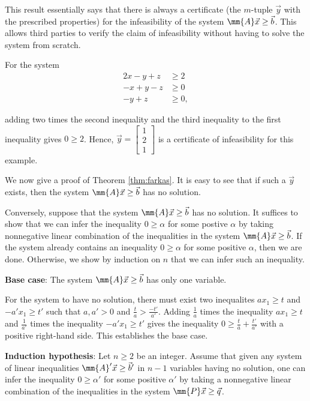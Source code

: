This result essentially says that there is always a certificate (the
\(m\)-tuple \(\vec{y}\) with the prescribed properties) for the
infeasibility of the system \(\mm{A}\vec{x} \geq \vec{b}\). This allows
third parties to verify the claim of infeasibility without having to
solve the system from scratch.

\begin{example}{}{}
\protect\hypertarget{ex:unnamed-chunk-2}{}{\label{ex:unnamed-chunk-2}} For
the system
\begin{align*}
2x - y + z & \geq 2 \\
-x + y - z & \geq 0 \\
   - y + z & \geq 0,
\end{align*}

adding two times the second inequality and the third inequality to the
first inequality gives \(0 \geq 2\). Hence,
\(\vec{y} = \begin{bmatrix} 1\\ 2 \\ 1\end{bmatrix}\) is a certificate
of infeasibility for this example.
\end{example}

We now give a proof of Theorem \ref{thm:farkas}. It is easy to see that
if such a \(\vec{y}\) exists, then the system
\(\mm{A}\vec{x} \geq \vec{b}\) has no solution.

Conversely, suppose that the system \(\mm{A}\vec{x} \geq \vec{b}\) has
no solution. It suffices to show that we can infer the inequality
\(0 \geq \alpha\) for some postive \(\alpha\) by taking nonnegative
linear combination of the inequalities in the system
\(\mm{A}\vec{x} \geq \vec{b}\). If the system already contains an
inequality \(0 \geq \alpha\) for some positive \(\alpha\), then we are
done. Otherwise, we show by induction on \(n\) that we can infer such an
inequality.

\textbf{Base case}: The system \(\mm{A}\vec{x} \geq \vec{b}\) has only
one variable.

For the system to have no solution, there must exist two inequalites
\(ax_1 \geq t\) and \(-a'x_1 \geq t'\) such that \(a, a' \gt 0\) and
\(\frac{t}{a} \gt \frac{-t'}{a'}\). Adding \(\frac{1}{a}\) times the
inequality \(ax_1 \geq t\) and \(\frac{1}{a'}\) times the inequality
\(-a'x_1 \geq t'\) gives the inequality
\(0 \geq \frac{t}{a} + \frac{t'}{a'}\) with a positive right-hand side.
This establishes the base case.

\textbf{Induction hypothesis}: Let \(n \geq 2\) be an integer. Assume
that given any system of linear inequalities
\(\mm{A}'\vec{x} \geq \vec{b}'\) in \(n-1\) variables having no
solution, one can infer the inequality \(0 \geq \alpha'\) for some
positive \(\alpha'\) by taking a nonnegative linear combination of the
inequalities in the system \(\mm{P}\vec{x} \geq \vec{q}\).

